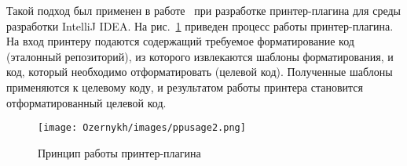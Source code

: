 
Такой подход был применен в работе~\cite{paper:while} при разработке принтер-плагина для среды разработки IntelliJ IDEA. %
На рис.~\ref{intro:howto} приведен процесс работы принтер-плагина. 
На вход принтеру подаются содержащий требуемое форматирование код (эталонный репозиторий), из которого извлекаются шаблоны форматирования, и код, который необходимо отформатировать (целевой код).
Полученные шаблоны применяются к целевому коду, и результатом работы принтера становится отформатированный целевой код.


\begin{figure}
    \centering
    \texttt{[image: Ozernykh/images/ppusage2.png]}
    \caption{Принцип работы принтер-плагина}
    \label{intro:howto}

\end{figure}

